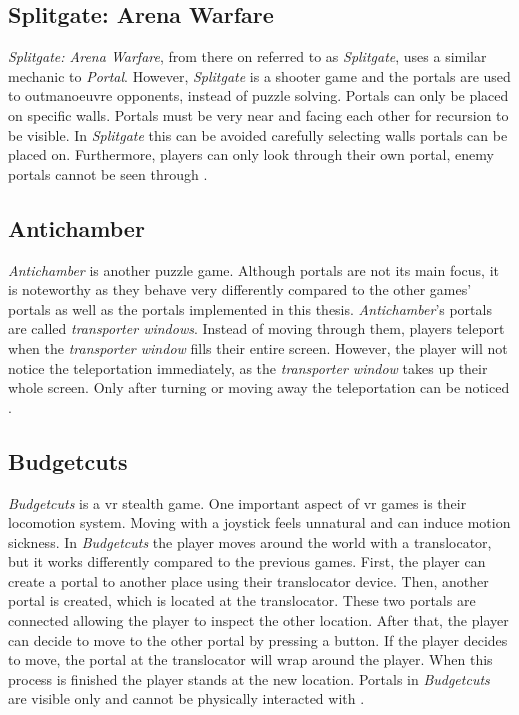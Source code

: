 \subsection{Splitgate: Arena Warfare}
\textit{Splitgate: Arena Warfare}, from there on referred to as \textit{Splitgate}, uses a similar mechanic to \textit{Portal}. However, \textit{Splitgate} is a shooter game and the portals are used to outmanoeuvre opponents, instead of puzzle solving. Portals can only be placed on specific walls. Portals must be very near and facing each other for recursion to be visible. In \textit{Splitgate} this can be avoided carefully selecting walls portals can be placed on. Furthermore, players can only look through their own portal, enemy portals cannot be seen through \cite{splitgate}.

\subsection{Antichamber}
\textit{Antichamber} is another puzzle game. Although portals are not its main focus, it is noteworthy as they behave very differently compared to the other games' portals as well as the portals implemented in this thesis. \textit{Antichamber}'s portals are called \textit{transporter windows}. Instead of moving through them, players teleport when the \textit{transporter window} fills their entire screen. However, the player will not notice the teleportation immediately, as the \textit{transporter window} takes up their whole screen. Only after turning or moving away the teleportation can be noticed \cite{antichamber}.

\subsection{Budgetcuts}
\textit{Budgetcuts} is a \gls{vr} stealth game. One important aspect of \gls{vr} games is their locomotion system. Moving with a joystick feels unnatural and can induce motion sickness. In \textit{Budgetcuts} the player moves around the world with a translocator, but it works differently compared to the previous games. First, the player can create a portal to another place using their translocator device. Then, another portal is created, which is located at the translocator. These two portals are connected allowing the player to inspect the other location. After that, the player can decide to move to the other portal by pressing a button. If the player decides to move, the portal at the translocator will wrap around the player. When this process is finished the player stands at the new location. Portals in \textit{Budgetcuts} are visible only and cannot be physically interacted with \cite{budgetcuts, gdc:budgetcuts}.

